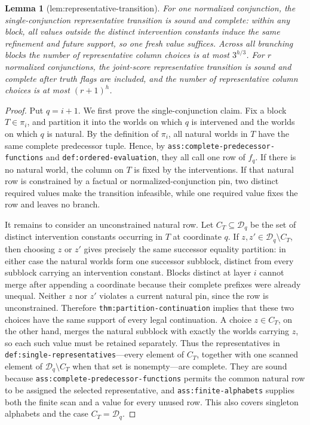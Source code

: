 \documentclass{article}
\newtheorem{lemma}{Lemma}
\begin{document}
\begin{lemma}[lem:representative-transition]\label{lem:representative-transition}
For one normalized conjunction, the single-conjunction representative transition is sound and complete: within any block, all values outside the distinct intervention constants induce the same refinement and future support, so one fresh value suffices. Across all branching blocks the number of representative column choices is at most \(3^{h/3}\). For \(r\) normalized conjunctions, the joint-score representative transition is sound and complete after truth flags are included, and the number of representative column choices is at most \((r+1)^h\).
\end{lemma}
\begin{proof}
Put \(q=i+1\).  We first prove the single-conjunction claim.  Fix a block \(T\in\pi_i\), and partition it into the worlds on which \(q\) is intervened and the worlds on which \(q\) is natural.  By the definition of \(\pi_i\), all natural worlds in \(T\) have the same complete predecessor tuple.  Hence, by \texttt{ass:complete-predecessor-functions} and \texttt{def:ordered-evaluation}, they all call one row of \(f_q\).  If there is no natural world, the column on \(T\) is fixed by the interventions.  If that natural row is constrained by a factual or normalized-conjunction pin, two distinct required values make the transition infeasible, while one required value fixes the row and leaves no branch.

It remains to consider an unconstrained natural row.  Let \(C_T\subseteq\mathcal D_q\) be the set of distinct intervention constants occurring in \(T\) at coordinate \(q\).  If \(z,z'\in\mathcal D_q\setminus C_T\), then choosing \(z\) or \(z'\) gives precisely the same successor equality partition: in either case the natural worlds form one successor subblock, distinct from every subblock carrying an intervention constant.  Blocks distinct at layer \(i\) cannot merge after appending a coordinate because their complete prefixes were already unequal.  Neither \(z\) nor \(z'\) violates a current natural pin, since the row is unconstrained.  Therefore \texttt{thm:partition-continuation} implies that these two choices have the same support of every legal continuation.  A choice \(z\in C_T\), on the other hand, merges the natural subblock with exactly the worlds carrying \(z\), so each such value must be retained separately.  Thus the representatives in \texttt{def:single-representatives}---every element of \(C_T\), together with one scanned element of \(\mathcal D_q\setminus C_T\) when that set is nonempty---are complete.  They are sound because \texttt{ass:complete-predecessor-functions} permits the common natural row to be assigned the selected representative, and \texttt{ass:finite-alphabets} supplies both the finite scan and a value for every unused row.  This also covers singleton alphabets and the case \(C_T=\mathcal D_q\).


\end{proof}
\end{document}
